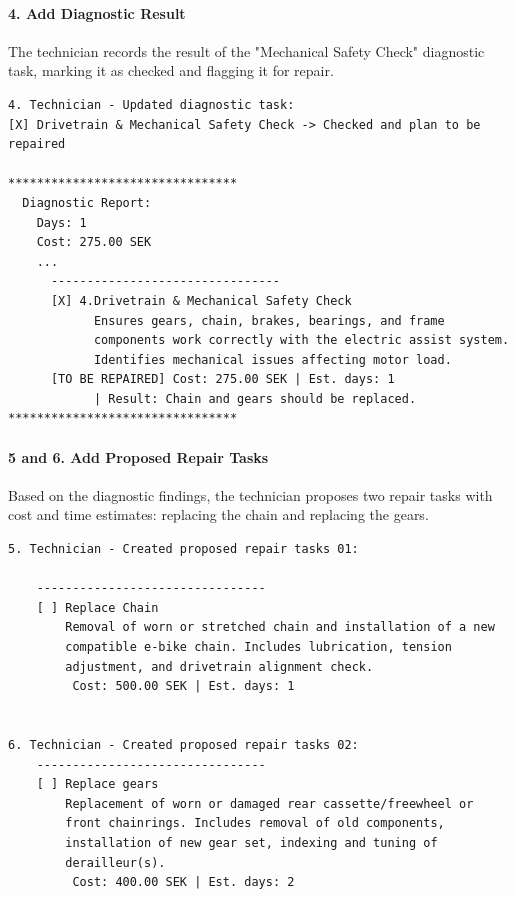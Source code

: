 \documentclass[a4paper]{scrartcl}
\begin{document}
\paragraph{4. Add Diagnostic Result} 
The technician records the result of the "Mechanical Safety Check" diagnostic task, marking it as checked and flagging it for repair.

\begin{lstlisting}[style=outputstyle, caption={Printout from add diagnostic result system operation}, label={fig:run-add-diagnostic-result}]
4. Technician - Updated diagnostic task:
[X] Drivetrain & Mechanical Safety Check -> Checked and plan to be repaired

********************************
  Diagnostic Report:
    Days: 1
    Cost: 275.00 SEK
    ...
      --------------------------------
      [X] 4.Drivetrain & Mechanical Safety Check
            Ensures gears, chain, brakes, bearings, and frame
            components work correctly with the electric assist system.
            Identifies mechanical issues affecting motor load.
      [TO BE REPAIRED] Cost: 275.00 SEK | Est. days: 1
            | Result: Chain and gears should be replaced.
********************************
\end{lstlisting}

\paragraph{5 and 6. Add Proposed Repair Tasks} 
Based on the diagnostic findings, the technician proposes two repair tasks with cost and time estimates: replacing the chain and replacing the gears.

\begin{lstlisting}[style=outputstyle, caption={Printout from add proposed repair tasks}, label={fig:run-add-proposed-repair-tasks}]
5. Technician - Created proposed repair tasks 01:

    --------------------------------
    [ ] Replace Chain
        Removal of worn or stretched chain and installation of a new
        compatible e-bike chain. Includes lubrication, tension
        adjustment, and drivetrain alignment check.
         Cost: 500.00 SEK | Est. days: 1


6. Technician - Created proposed repair tasks 02:
    --------------------------------
    [ ] Replace gears
        Replacement of worn or damaged rear cassette/freewheel or
        front chainrings. Includes removal of old components,
        installation of new gear set, indexing and tuning of
        derailleur(s).
         Cost: 400.00 SEK | Est. days: 2
\end{lstlisting}
\end{document}
